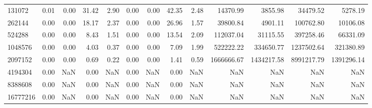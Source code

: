 \begin{tabular}{lrrrrrrrrrrrr}
131072 & 0.01 & 0.00 & 31.42 & 2.90 & 0.00 & 0.00 & 42.35 & 2.48 & 14370.99 & 3855.98 & 34479.52 & 5278.19 \\
262144 & 0.00 & 0.00 & 18.17 & 2.37 & 0.00 & 0.00 & 26.96 & 1.57 & 39800.84 & 4901.11 & 100762.80 & 10106.08 \\
524288 & 0.00 & 0.00 & 8.43 & 1.51 & 0.00 & 0.00 & 13.54 & 2.09 & 112037.04 & 31115.55 & 397258.46 & 66331.09 \\
1048576 & 0.00 & 0.00 & 4.03 & 0.37 & 0.00 & 0.00 & 7.09 & 1.99 & 522222.22 & 334650.77 & 1237502.64 & 321380.89 \\
2097152 & 0.00 & 0.00 & 0.69 & 0.22 & 0.00 & 0.00 & 1.41 & 0.59 & 1666666.67 & 1434217.58 & 8991217.79 & 1391296.14 \\
4194304 & 0.00 & NaN & 0.00 & NaN & 0.00 & NaN & 0.00 & NaN & NaN & NaN & NaN & NaN \\
8388608 & 0.00 & NaN & 0.00 & NaN & 0.00 & NaN & 0.00 & NaN & NaN & NaN & NaN & NaN \\
16777216 & 0.00 & NaN & 0.00 & NaN & 0.00 & NaN & 0.00 & NaN & NaN & NaN & NaN & NaN \\
\bottomrule
\end{tabular}
